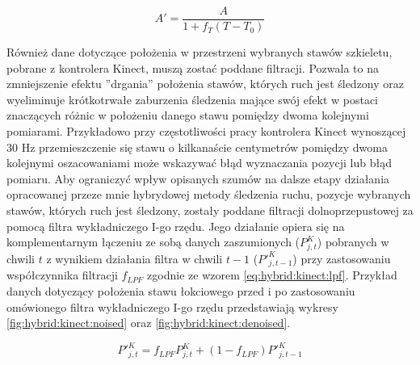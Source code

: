 \begin{equation}
	A' = \frac{A}{1+f_T (T-T_0)}
	\label{eq:hybrid:temperatureCorrection}
\end{equation}

Również dane dotyczące położenia w przestrzeni wybranych stawów szkieletu, pobrane z kontrolera Kinect, muszą zostać poddane filtracji. Pozwala to na zmniejszenie efektu ''drgania'' położenia stawów, których ruch jest śledzony oraz wyeliminuje krótkotrwałe zaburzenia śledzenia mające swój efekt w postaci znaczących różnic w położeniu danego stawu pomiędzy dwoma kolejnymi pomiarami. 
Przykładowo przy częstotliwości pracy kontrolera Kinect wynoszącej 30 Hz przemieszczenie się stawu o kilkanaście centymetrów pomiędzy dwoma kolejnymi oszacowaniami może wskazywać błąd wyznaczania pozycji lub błąd pomiaru. 
Aby ograniczyć wpływ opisanych szumów na dalsze etapy działania opracowanej przeze mnie hybrydowej metody śledzenia ruchu, pozycje wybranych stawów, których ruch jest śledzony, zostały poddane filtracji dolnoprzepustowej za pomocą filtra wykładniczego I-go rzędu. Jego działanie opiera się na komplementarnym łączeniu ze sobą danych zaszumionych ($P^K_{j,t}$) pobranych w chwili $t$ z wynikiem działania filtra w chwili $t-1$ ($P'^K_{j,t-1}$) przy zastosowaniu współczynnika filtracji $f_{LPF}$ zgodnie ze wzorem \eqref{eq:hybrid:kinect:lpf}. Przykład danych dotyczący położenia stawu łokciowego przed i po zastosowaniu omówionego filtra wykładniczego I-go rzędu przedstawiają wykresy \ref{fig:hybrid:kinect:noised} oraz \ref{fig:hybrid:kinect:denoised}.

\begin{equation}
	\label{eq:hybrid:kinect:lpf}
	P'^K_{j,t} = f_{LPF} P^K_{j,t} + (1-f_{LPF})P'^K_{j,t-1}
\end{equation}

